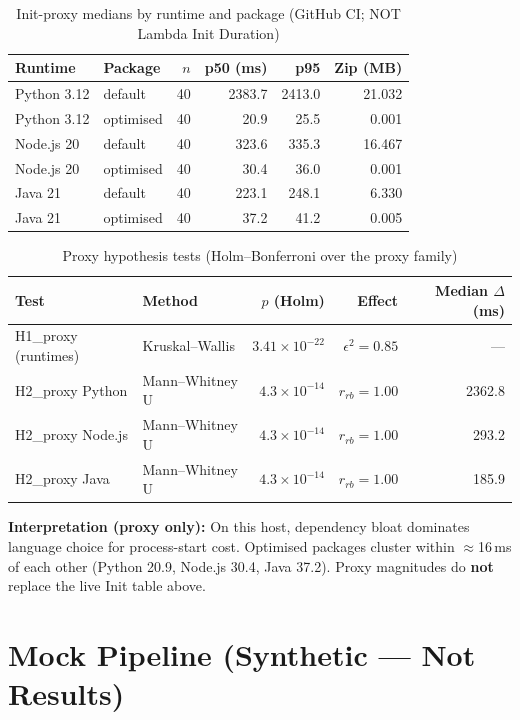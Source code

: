 \begin{table}[h]
\centering
\caption{Init-proxy medians by runtime and package (GitHub CI; NOT Lambda Init Duration)}
\label{tab:eval_proxy_medians}
\begin{tabular}{llrrrr}
\hline
\textbf{Runtime} & \textbf{Package} & \textbf{$n$} & \textbf{p50 (ms)} & \textbf{p95} & \textbf{Zip (MB)} \\
\hline
Python 3.12 & default & 40 & 2383.7 & 2413.0 & 21.032 \\
Python 3.12 & optimised & 40 & 20.9 & 25.5 & 0.001 \\
Node.js 20 & default & 40 & 323.6 & 335.3 & 16.467 \\
Node.js 20 & optimised & 40 & 30.4 & 36.0 & 0.001 \\
Java 21 & default & 40 & 223.1 & 248.1 & 6.330 \\
Java 21 & optimised & 40 & 37.2 & 41.2 & 0.005 \\
\hline
\end{tabular}
\end{table}

\begin{table}[h]
\centering
\caption{Proxy hypothesis tests (Holm--Bonferroni over the proxy family)}
\label{tab:eval_proxy_tests}
\begin{tabular}{llrrr}
\hline
\textbf{Test} & \textbf{Method} & \textbf{$p$ (Holm)} & \textbf{Effect} & \textbf{Median $\Delta$ (ms)} \\
\hline
H1\_proxy (runtimes) & Kruskal--Wallis & $3.41\times10^{-22}$ & $\epsilon^2=0.85$ & --- \\
H2\_proxy Python & Mann--Whitney U & $4.3\times10^{-14}$ & $r_{rb}=1.00$ & 2362.8 \\
H2\_proxy Node.js & Mann--Whitney U & $4.3\times10^{-14}$ & $r_{rb}=1.00$ & 293.2 \\
H2\_proxy Java & Mann--Whitney U & $4.3\times10^{-14}$ & $r_{rb}=1.00$ & 185.9 \\
\hline
\end{tabular}
\end{table}

\textbf{Interpretation (proxy only):} On this host, dependency bloat dominates language
choice for process-start cost. Optimised packages cluster within $\approx$16\,ms of each
other (Python 20.9, Node.js 30.4, Java 37.2). Proxy magnitudes do \textbf{not} replace the
live Init table above.

\section{Mock Pipeline (Synthetic --- Not Results)}

